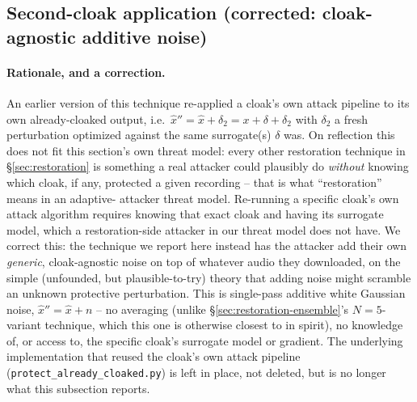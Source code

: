 \documentclass[11pt]{article}
\begin{document}
\subsection{Second-cloak application (corrected: cloak-agnostic additive noise)}
\label{sec:restoration-secondcloak}

\paragraph{Rationale, and a correction.} An earlier version of this
technique re-applied a cloak's own attack pipeline to its own
already-cloaked output, i.e.\ $\hat{x}'' = \hat{x} + \delta_2 =
x + \delta + \delta_2$ with $\delta_2$ a fresh perturbation optimized
against the same surrogate(s) $\delta$ was. On reflection this does
not fit this section's own threat model: every other restoration
technique in \S\ref{sec:restoration} is something a real attacker could
plausibly do \emph{without} knowing which cloak, if any, protected a
given recording -- that is what ``restoration'' means in an adaptive-
attacker threat model. Re-running a specific cloak's own attack
algorithm requires knowing that exact cloak and having its surrogate
model, which a restoration-side attacker in our threat model does not
have. We correct this: the technique we report here instead has the
attacker add their own \emph{generic}, cloak-agnostic noise on top of
whatever audio they downloaded, on the simple (unfounded, but
plausible-to-try) theory that adding noise might scramble an unknown
protective perturbation. This is single-pass additive white Gaussian
noise, $\hat{x}'' = \hat{x} + n$ -- no averaging (unlike
\S\ref{sec:restoration-ensemble}'s $N=5$-variant technique, which
this one is otherwise closest to in spirit), no knowledge of, or
access to, the specific cloak's surrogate model or gradient. The
underlying implementation that reused the cloak's own attack pipeline
(\texttt{protect\_already\_cloaked.py}) is left in place, not deleted,
but is no longer what this subsection reports.
\end{document}

